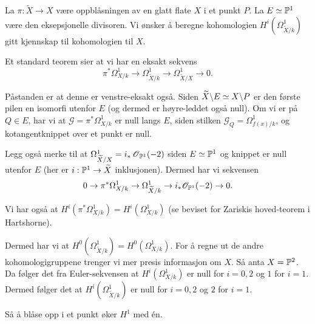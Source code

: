 \documentclass[11pt, norsk]{article}
\begin{document}
La $\pi:\widetilde X \to X$ være oppblåsningen av en glatt flate $X$ i et punkt $P$. La $E \simeq \mathbb{P}^1$ være den eksepsjonelle divisoren. Vi ønsker å beregne kohomologien $H^i(\Omega_{\widetilde X/k}^1)$ gitt kjennskap til kohomologien til $X$.

Et standard teorem sier at vi har en eksakt sekvens
$$
\pi^\ast \Omega^1_{X/k} \to \Omega^1_{\widetilde X/k} \to \Omega^1_{\widetilde X/X} \to 0.
$$

Påstanden er at denne er venstre-eksakt også. Siden $\widetilde X \backslash E \simeq X \backslash P$ er den første pilen en isomorfi utenfor $E$ (og dermed er høyre-leddet også null). Om vi er på $Q \in E$, har vi at $\mathscr G = {\pi^\ast \Omega_{X/k}^1}$ er null langs $E$, siden stilken $\mathscr G_Q=\Omega_{f(x)/k}^1$, og kotangentknippet over et punkt er null.

Legg også merke til at $\Omega^1_{\widetilde X/X}=i_\ast \operatorname{\mathscr{O}}_{\mathbb{P}^1}(-2)$ siden $E \simeq \mathbb{P}^1$ og knippet er null utenfor $E$ (her er $i:\mathbb{P}^1 \to \widetilde X$ inklusjonen). Dermed har vi sekvensen
$$
0 \to \pi^\ast \Omega^1_{X/k} \to \Omega^1_{\widetilde X/k} \to i_\ast \mathscr O_{\mathbb{P}^1} (-2) \to 0.
$$

Vi har også at $H^i(\pi^\ast \Omega^1_{X/k})= H^i(\Omega_{X/k}^1)$ (se beviset for Zariskis hoved-teorem i Hartshorne).

Dermed har vi at $H^0(\Omega_{\widetilde X/k}^1) = H^0(\Omega_{X/k}^1)$. For å regne ut de andre kohomologigruppene trenger vi mer presis informasjon om $X$. Så anta $X= \mathbb{P}^2$. Da følger det fra Euler-sekvensen at $H^i(\Omega_{X/k}^1)$ er null for $i=0,2$ og $1$ for $i=1$. Dermed følger det at $H^i(\Omega_{\widetilde X/k}^1)$ er null for $i=0,2$ og $2$ for $i=1$.

Så å blåse opp i et punkt øker $H^1$ med én.
\end{document}
